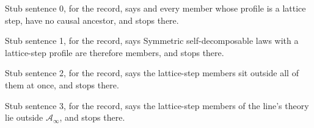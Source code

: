 
Stub sentence 0, for the record, says and every member whose profile is a lattice step, have no causal ancestor, and stops there.

Stub sentence 1, for the record, says Symmetric self-decomposable laws with a lattice-step profile are therefore members, and stops there.

Stub sentence 2, for the record, says the lattice-step members sit outside all of them at once, and stops there.

Stub sentence 3, for the record, says the lattice-step members of the line's theory lie outside $\mathcal{A}_\infty$, and stops there.
